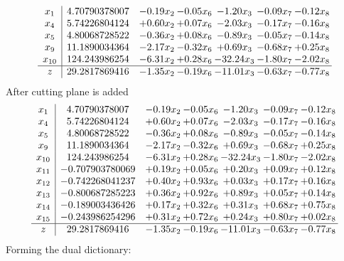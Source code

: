 \documentclass[8pt]{article}
\begin{document}
\[\begin{array}{c| c c@{\hskip 2pt} c@{\hskip 2pt} c@{\hskip 2pt} c@{\hskip 2pt} c@{\hskip 2pt} }
 x_{1}   &  4.70790378007 & -0.19 x_{2} & -0.05 x_{6} & -1.20 x_{3} & -0.09 x_{7} & -0.12 x_{8}\\
 x_{4}   &  5.74226804124 & +  0.60 x_{2} & +  0.07 x_{6} & -2.03 x_{3} & -0.17 x_{7} & -0.16 x_{8}\\
 x_{5}   &  4.80068728522 & -0.36 x_{2} & +  0.08 x_{6} & -0.89 x_{3} & -0.05 x_{7} & -0.14 x_{8}\\
 x_{9}   &  11.1890034364 & -2.17 x_{2} & -0.32 x_{6} & +  0.69 x_{3} & -0.68 x_{7} & +  0.25 x_{8}\\
 x_{10}   &  124.243986254 & -6.31 x_{2} & +  0.28 x_{6} & -32.24 x_{3} & -1.80 x_{7} & -2.02 x_{8}\\
\hline
z    &  29.2817869416 & -1.35 x_{2} & -0.19 x_{6} & -11.01 x_{3} & -0.63 x_{7} & -0.77 x_{8}\\
\end{array}\]
 After cutting plane is added 
\[\begin{array}{c| c c@{\hskip 2pt} c@{\hskip 2pt} c@{\hskip 2pt} c@{\hskip 2pt} c@{\hskip 2pt} }
 x_{1}   &  4.70790378007 & -0.19 x_{2} & -0.05 x_{6} & -1.20 x_{3} & -0.09 x_{7} & -0.12 x_{8}\\
 x_{4}   &  5.74226804124 & +  0.60 x_{2} & +  0.07 x_{6} & -2.03 x_{3} & -0.17 x_{7} & -0.16 x_{8}\\
 x_{5}   &  4.80068728522 & -0.36 x_{2} & +  0.08 x_{6} & -0.89 x_{3} & -0.05 x_{7} & -0.14 x_{8}\\
 x_{9}   &  11.1890034364 & -2.17 x_{2} & -0.32 x_{6} & +  0.69 x_{3} & -0.68 x_{7} & +  0.25 x_{8}\\
 x_{10}   &  124.243986254 & -6.31 x_{2} & +  0.28 x_{6} & -32.24 x_{3} & -1.80 x_{7} & -2.02 x_{8}\\
 x_{11}   &  -0.707903780069 & +  0.19 x_{2} & +  0.05 x_{6} & +  0.20 x_{3} & +  0.09 x_{7} & +  0.12 x_{8}\\
 x_{12}   &  -0.742268041237 & +  0.40 x_{2} & +  0.93 x_{6} & +  0.03 x_{3} & +  0.17 x_{7} & +  0.16 x_{8}\\
 x_{13}   &  -0.800687285223 & +  0.36 x_{2} & +  0.92 x_{6} & +  0.89 x_{3} & +  0.05 x_{7} & +  0.14 x_{8}\\
 x_{14}   &  -0.189003436426 & +  0.17 x_{2} & +  0.32 x_{6} & +  0.31 x_{3} & +  0.68 x_{7} & +  0.75 x_{8}\\
 x_{15}   &  -0.243986254296 & +  0.31 x_{2} & +  0.72 x_{6} & +  0.24 x_{3} & +  0.80 x_{7} & +  0.02 x_{8}\\
\hline
z    &  29.2817869416 & -1.35 x_{2} & -0.19 x_{6} & -11.01 x_{3} & -0.63 x_{7} & -0.77 x_{8}\\
\end{array}\]
Forming the dual dictionary:
\end{document}
